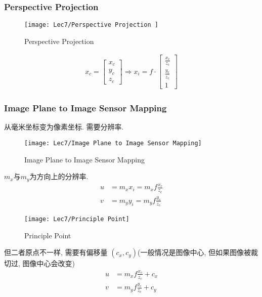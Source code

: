 \subsubsection{Perspective Projection}
\begin{figure}[H]
    \centering
    \texttt{[image: Lec7/Perspective Projection ]}
    \caption{Perspective Projection }
\end{figure}
\begin{align*}
    x_c=\begin{bmatrix}
        x_c\\y_c\\z_c
    \end{bmatrix}\Longrightarrow x_i=f\cdot \begin{bmatrix}
        \frac{x_c}{z_c}\\ \frac{y_c}{z_c} \\1
    \end{bmatrix}
\end{align*}

\subsubsection{Image Plane to Image Sensor Mapping}
从毫米坐标变为像素坐标. 需要分辨率. 

\begin{figure}[H]
    \centering
    \texttt{[image: Lec7/Image Plane to Image Sensor Mapping]}
    \caption{Image Plane to Image Sensor Mapping}
\end{figure}

$m_x$与$m_y$为方向上的分辨率. 
\begin{align*}
    u&=m_x x_i= m_x f \frac{x_c}{z_c}\\
    v&=m_y y_i= m_y f \frac{y_c}{z_c}
\end{align*}

\begin{figure}[H]
    \centering
    \texttt{[image: Lec7/Principle Point]}
    \caption{Principle Point}
\end{figure}

但二者原点不一样, 需要有偏移量 $(c_x,c_y)$(一般情况是图像中心, 但如果图像被裁切过, 图像中心会改变)
\begin{align*}
    u&= m_x f \frac{x_c}{z_c}+c_x\\
    v&= m_y f \frac{y_c}{z_c}+c_y
\end{align*}

